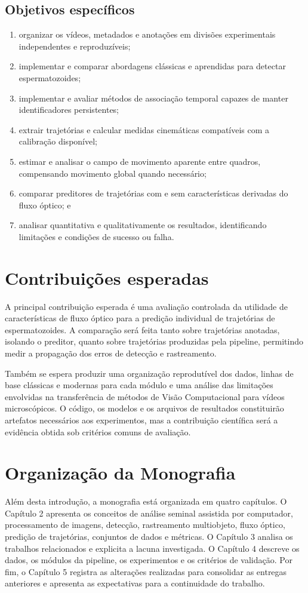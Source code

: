\subsection{Objetivos específicos}

\begin{enumerate}
	\item organizar os vídeos, metadados e anotações em divisões experimentais independentes e reproduzíveis;
	\item implementar e comparar abordagens clássicas e aprendidas para detectar espermatozoides;
	\item implementar e avaliar métodos de associação temporal capazes de manter identificadores persistentes;
	\item extrair trajetórias e calcular medidas cinemáticas compatíveis com a calibração disponível;
	\item estimar e analisar o campo de movimento aparente entre quadros, compensando movimento global quando necessário;
	\item comparar preditores de trajetórias com e sem características derivadas do fluxo óptico; e
	\item analisar quantitativa e qualitativamente os resultados, identificando limitações e condições de sucesso ou falha.
\end{enumerate}

\section{Contribuições esperadas}

A principal contribuição esperada é uma avaliação controlada da utilidade de características de fluxo óptico para a predição individual de trajetórias de espermatozoides. A comparação será feita tanto sobre trajetórias anotadas, isolando o preditor, quanto sobre trajetórias produzidas pela pipeline, permitindo medir a propagação dos erros de detecção e rastreamento.

Também se espera produzir uma organização reprodutível dos dados, linhas de base clássicas e modernas para cada módulo e uma análise das limitações envolvidas na transferência de métodos de Visão Computacional para vídeos microscópicos. O código, os modelos e os arquivos de resultados constituirão artefatos necessários aos experimentos, mas a contribuição científica será a evidência obtida sob critérios comuns de avaliação.

\section{Organização da Monografia}

Além desta introdução, a monografia está organizada em quatro capítulos. O Capítulo 2 apresenta os conceitos de análise seminal assistida por computador, processamento de imagens, detecção, rastreamento multiobjeto, fluxo óptico, predição de trajetórias, conjuntos de dados e métricas. O Capítulo 3 analisa os trabalhos relacionados e explicita a lacuna investigada. O Capítulo 4 descreve os dados, os módulos da pipeline, os experimentos e os critérios de validação. Por fim, o Capítulo 5 registra as alterações realizadas para consolidar as entregas anteriores e apresenta as expectativas para a continuidade do trabalho.
